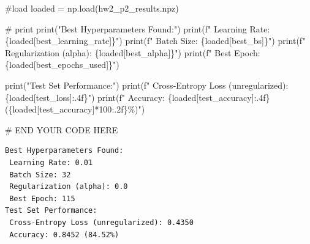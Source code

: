 \documentclass[
  letterpaper,
  DIV=11,
  numbers=noendperiod]{scrartcl}
\newenvironment{Shaded}{\begin{snugshade}}{\end{snugshade}}
\newcommand{\BuiltInTok}[1]{\textcolor[rgb]{0.00,0.23,0.31}{#1}}
\newcommand{\CommentTok}[1]{\textcolor[rgb]{0.37,0.37,0.37}{#1}}
\newcommand{\DecValTok}[1]{\textcolor[rgb]{0.68,0.00,0.00}{#1}}
\newcommand{\NormalTok}[1]{\textcolor[rgb]{0.00,0.23,0.31}{#1}}
\newcommand{\OperatorTok}[1]{\textcolor[rgb]{0.37,0.37,0.37}{#1}}
\newcommand{\RegionMarkerTok}[1]{\textcolor[rgb]{0.00,0.23,0.31}{#1}}
\newcommand{\SpecialCharTok}[1]{\textcolor[rgb]{0.37,0.37,0.37}{#1}}
\newcommand{\SpecialStringTok}[1]{\textcolor[rgb]{0.13,0.47,0.30}{#1}}
\newcommand{\StringTok}[1]{\textcolor[rgb]{0.13,0.47,0.30}{#1}}
\begin{document}
\begin{Shaded}
\begin{Highlighting}[]
\CommentTok{\#load}
\NormalTok{loaded }\OperatorTok{=}\NormalTok{ np.load(}\StringTok{\textquotesingle{}hw2\_p2\_results.npz\textquotesingle{}}\NormalTok{)  }

\CommentTok{\# print}
\BuiltInTok{print}\NormalTok{(}\StringTok{"Best Hyperparameters Found:"}\NormalTok{)}
\BuiltInTok{print}\NormalTok{(}\SpecialStringTok{f" Learning Rate: }\SpecialCharTok{\{}\NormalTok{loaded[}\StringTok{\textquotesingle{}best\_learning\_rate\textquotesingle{}}\NormalTok{]}\SpecialCharTok{\}}\SpecialStringTok{"}\NormalTok{)}
\BuiltInTok{print}\NormalTok{(}\SpecialStringTok{f" Batch Size: }\SpecialCharTok{\{}\NormalTok{loaded[}\StringTok{\textquotesingle{}best\_bs\textquotesingle{}}\NormalTok{]}\SpecialCharTok{\}}\SpecialStringTok{"}\NormalTok{)}
\BuiltInTok{print}\NormalTok{(}\SpecialStringTok{f" Regularization (alpha): }\SpecialCharTok{\{}\NormalTok{loaded[}\StringTok{\textquotesingle{}best\_alpha\textquotesingle{}}\NormalTok{]}\SpecialCharTok{\}}\SpecialStringTok{"}\NormalTok{)}
\BuiltInTok{print}\NormalTok{(}\SpecialStringTok{f" Best Epoch: }\SpecialCharTok{\{}\NormalTok{loaded[}\StringTok{\textquotesingle{}best\_epochs\_used\textquotesingle{}}\NormalTok{]}\SpecialCharTok{\}}\SpecialStringTok{"}\NormalTok{)}

\BuiltInTok{print}\NormalTok{(}\StringTok{"Test Set Performance:"}\NormalTok{)}
\BuiltInTok{print}\NormalTok{(}\SpecialStringTok{f" Cross{-}Entropy Loss (unregularized): }\SpecialCharTok{\{}\NormalTok{loaded[}\StringTok{\textquotesingle{}test\_loss\textquotesingle{}}\NormalTok{]}\SpecialCharTok{:.4f\}}\SpecialStringTok{"}\NormalTok{)}
\BuiltInTok{print}\NormalTok{(}\SpecialStringTok{f" Accuracy: }\SpecialCharTok{\{}\NormalTok{loaded[}\StringTok{\textquotesingle{}test\_accuracy\textquotesingle{}}\NormalTok{]}\SpecialCharTok{:.4f\}}\SpecialStringTok{ (}\SpecialCharTok{\{}\NormalTok{loaded[}\StringTok{\textquotesingle{}test\_accuracy\textquotesingle{}}\NormalTok{]}\OperatorTok{*}\DecValTok{100}\SpecialCharTok{:.2f\}}\SpecialStringTok{\%)"}\NormalTok{)}

\CommentTok{\# }\RegionMarkerTok{END}\CommentTok{ YOUR CODE HERE}
\end{Highlighting}
\end{Shaded}

\begin{verbatim}
Best Hyperparameters Found:
 Learning Rate: 0.01
 Batch Size: 32
 Regularization (alpha): 0.0
 Best Epoch: 115
Test Set Performance:
 Cross-Entropy Loss (unregularized): 0.4350
 Accuracy: 0.8452 (84.52%)
\end{verbatim}
\end{document}
